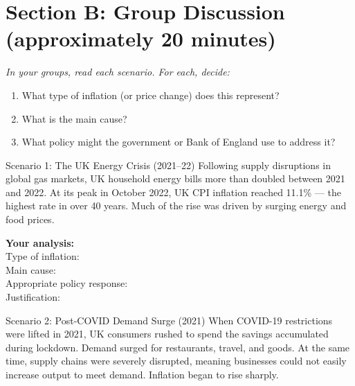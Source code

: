 \documentclass[12pt,a4paper]{article}
\begin{document}
\newpage

\section*{Section B: Group Discussion (approximately 20 minutes)}

\textit{In your groups, read each scenario. For each, decide:}
\begin{enumerate}[label=(\alph*), topsep=2pt]
    \item What type of inflation (or price change) does this represent?
    \item What is the main cause?
    \item What policy might the government or Bank of England use to address it?
\end{enumerate}

\vspace{0.8em}

\begin{scenario}{Scenario 1: The UK Energy Crisis (2021--22)}
    Following supply disruptions in global gas markets, UK household energy bills more than doubled between 2021 and 2022. At its peak in October 2022, UK CPI inflation reached 11.1\% --- the highest rate in over 40 years. Much of the rise was driven by surging energy and food prices.
\end{scenario}

\vspace{0.5em}
\textbf{Your analysis:}\\
Type of inflation: \dotfill \\[0.4em]
Main cause: \dotfill \\[0.4em]
Appropriate policy response: \dotfill \\[0.4em]
Justification: \dotfill

\vspace{1em}

\begin{scenario}{Scenario 2: Post-COVID Demand Surge (2021)}
    When COVID-19 restrictions were lifted in 2021, UK consumers rushed to spend the savings accumulated during lockdown. Demand surged for restaurants, travel, and goods. At the same time, supply chains were severely disrupted, meaning businesses could not easily increase output to meet demand. Inflation began to rise sharply.
\end{scenario}
\end{document}
